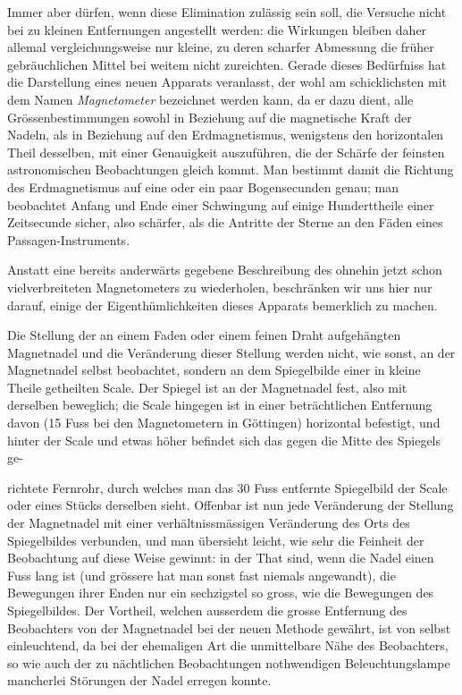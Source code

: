 Immer aber dürfen, wenn diese Elimination zulässig sein soll, die Versuche nicht bei zu kleinen Entfernungen angestellt werden: die Wirkungen bleiben daher allemal vergleichungsweise nur kleine, zu deren scharfer Abmessung die früher gebräuchlichen Mittel bei weitem nicht zureichten. Gerade dieses Bedürfniss hat die Darstellung eines neuen Apparats veranlasst, der wohl am schicklichsten mit dem Namen \textit{Magnetometer} bezeichnet werden kann, da er dazu dient, alle Grössenbestimmungen sowohl in Beziehung auf die magnetische Kraft der Nadeln, als in Beziehung auf den Erdmagnetismus, wenigstens den horizontalen Theil desselben, mit einer Genauigkeit auszuführen, die der Schärfe der feinsten astronomischen Beobachtungen gleich kommt. Man bestimmt damit die Richtung des Erdmagnetismus auf eine oder ein paar Bogensecunden genau; man beobachtet Anfang und Ende einer Schwingung auf einige Hunderttheile einer Zeitsecunde sicher, also schärfer, als die Antritte der Sterne an den Fäden eines Passagen-Instruments.

Anstatt eine bereits anderwärts gegebene Beschreibung des ohnehin jetzt schon vielverbreiteten Magnetometers zu wiederholen, beschränken wir uns hier nur darauf, einige der Eigenthümlichkeiten dieses Apparats bemerklich zu machen.

Die Stellung der an einem Faden oder einem feinen Draht aufgehängten Magnetnadel und die Veränderung dieser Stellung werden nicht, wie sonst, an der Magnetnadel selbst beobachtet, sondern an dem Spiegelbilde einer in kleine Theile getheilten Scale. Der Spiegel ist an der Magnetnadel fest, also mit derselben beweglich; die Scale hingegen ist in einer beträchtlichen Entfernung davon (15 Fuss bei den Magnetometern in Göttingen) horizontal befestigt, und hinter der Scale und etwas höher befindet sich das gegen die Mitte des Spiegels ge-
\par\clearpage
{}
\noindent richtete Fernrohr, durch welches man das 30 Fuss entfernte Spiegelbild der Scale oder eines Stücks derselben sieht. Offenbar ist nun jede Veränderung der Stellung der Magnetnadel mit einer verhältnissmässigen Veränderung des Orts des Spiegelbildes verbunden, und man übersieht leicht, wie sehr die Feinheit der Beobachtung auf diese Weise gewinnt: in der That sind, wenn die Nadel einen Fuss lang ist (und grössere hat man sonst fast niemals angewandt), die Bewegungen ihrer Enden nur ein sechzigstel so gross, wie die Bewegungen des Spiegelbildes. Der Vortheil, welchen ausserdem die grosse Entfernung des Beobachters von der Magnetnadel bei der neuen Methode gewährt, ist von selbst einleuchtend, da bei der ehemaligen Art die unmittelbare Nähe des Beobachters, so wie auch der zu nächtlichen Beobachtungen nothwendigen Beleuchtungslampe mancherlei Störungen der Nadel erregen konnte.

